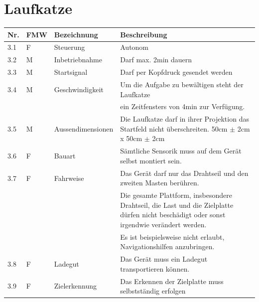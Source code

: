 \documentclass[a4paper]{report}
\begin{document}
\section{Laufkatze}
\begin{tabular}{|p{}|p{}|p{}|p{}|}
	\hline
	\textbf{Nr.} & \textbf{FMW\footnotemark} & \textbf{Bezeichnung} & \textbf{Beschreibung} \\
	\hline
	3.1 & F & Steuerung & Autonom \\
	\hline
	3.2 & M & Inbetriebnahme & Darf max. 2min dauern \\
	\hline
	3.3 & M & Startsignal & Darf per Kopfdruck gesendet werden \\
	\hline
	3.4 & M & Geschwindigkeit & Um die Aufgabe zu bewältigen steht der Laufkatze\\
	& & & ein Zeitfensters von 4min zur Verfügung. \\
	\hline
	3.5 & M & Aussendimensionen & Die Laufkatze darf in ihrer Projektion das Startfeld nicht überschreiten. 50cm $\pm$ 2cm x 50cm $\pm$ 2cm \\
	\hline
	3.6 & F & Bauart & Sämtliche Sensorik muss auf dem Gerät selbst montiert sein. \\
	\hline
	3.7 & F & Fahrweise & Das Gerät darf nur das Drahtseil und den zweiten Masten berühren.\\
	& & & Die gesamte Plattform, insbesondere Drahtseil, die Last und die Zielplatte dürfen nicht beschädigt oder sonst irgendwie verändert werden.\\
	& & & Es ist beispielsweise nicht erlaubt, Navigationshilfen anzubringen. \\
	\hline
	3.8 & F & Ladegut & Das Gerät muss ein Ladegut transportieren können. \\
	\hline
	3.9 & F & Zielerkennung & Das Erkennen der Zielplatte muss selbstständig erfolgen\\
	\hline
\end{tabular}
\end{document}
